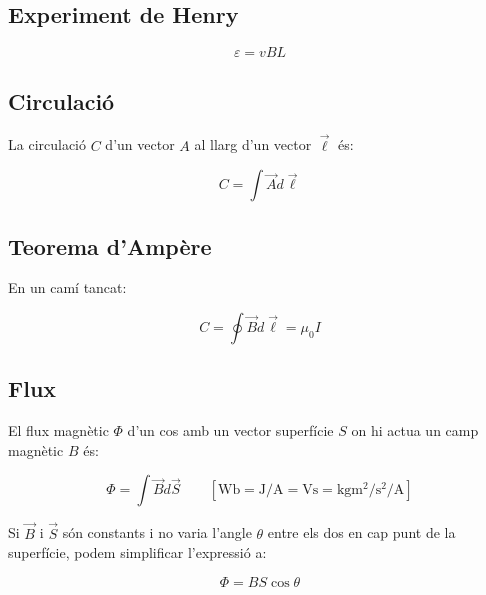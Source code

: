 \subsection{Experiment de Henry}
\label{sub:experiment_de_henry}

\begin{equation}
    \varepsilon = vBL
\end{equation}

\pagebreak

\subsection{Circulació}
\label{sub:circulacio}

La circulació $C$ d'un vector $A$ al llarg d'un vector $ \vec{\ell} $ és:

\begin{equation}
    C = \int \vec{A} d \vec{\ell}
\end{equation}

\subsection{Teorema d'Ampère}
\label{sub:teorema_d_ampere}

En un camí tancat:

\begin{equation}
    C = \oint \vec{B} d \vec{\ell} = \mu_0 I
\end{equation}



\subsection{Flux}
\label{sub:flux}

El flux magnètic $\Phi$ d'un cos amb un vector superfície $S$ on hi actua un
camp magnètic $B$ és:

\begin{equation}
    \Phi = \int \vec{B}  d\vec{S} \qquad \left[ \si{\weber} = \si{\joule\per\ampere} = \si{\volt\second} = \si{\kilo \gram \metre \squared \per \second \squared \per \ampere} \right]
\end{equation}

Si $\vec{B}$ i $\vec{S}$ són constants i no varia l'angle $\theta$ entre els
dos en cap punt de la superfície, podem simplificar l'expressió a:

\begin{equation}
    \Phi = BS\cos\theta
\end{equation}

